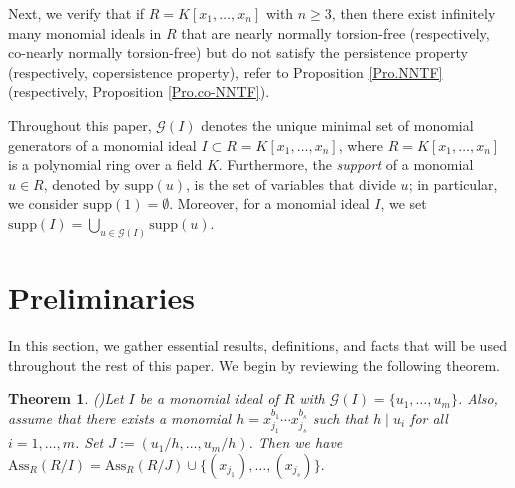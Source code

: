 \documentclass[11pt]{amsart}
\newtheorem{theorem}{Theorem}[section]
\begin{document}
Next, we verify that if $R=K[x_1,\ldots,x_n]$ with $n\geq 3$, then there exist infinitely many monomial ideals in $R$
 that are nearly normally torsion-free (respectively, co-nearly normally torsion-free) but do not satisfy the
persistence property (respectively, copersistence property), refer to Proposition  \ref{Pro.NNTF} (respectively, Proposition \ref{Pro.co-NNTF}). 
  

   
Throughout this paper,  $\mathcal{G}(I)$ denotes the unique minimal set of monomial generators of a monomial ideal $I\subset R=K[x_1, \ldots, x_n]$, where 
$R=K[x_1, \ldots, x_n]$ is  a polynomial  ring over a field $K$. Furthermore, the {\em support} of a monomial $u\in R$, denoted by $\mathrm{supp}(u)$, is the set of variables that divide $u$; in particular, we consider $\mathrm{supp}(1)=\emptyset$.  Moreover, for a monomial ideal $I$, we set $\mathrm{supp}(I)=\bigcup_{u \in \mathcal{G}(I)}\mathrm{supp}(u)$. 

 


\section{Preliminaries} \label{Section2}

In this section, we gather essential results, definitions, and facts that will be used throughout the rest of this paper. 
We begin by reviewing the following theorem. 

  
 

\begin{theorem} (\cite[Theorem 5.2] {KHN2})\label{5.2KHN}
Let $I$ be a monomial ideal of $R$ with $\mathcal{G}(I) =\{u_1,\ldots,u_m\}$. Also, assume that there exists a monomial $h=x_{j_1}^{b_1}\cdots x_{j_s}^{b_s}$ such that $h \mid  u_i$ for all $i=1,\ldots,m$. Set $J:=(u_1/h,\ldots,u_m/h)$. Then  we have      $\mathrm{Ass}_R(R/I)=\mathrm{Ass}_R(R/J)\cup\{ (x_{j_1}),\ldots,(x_{j_s})\}.$
\end{theorem}



\end{document}
